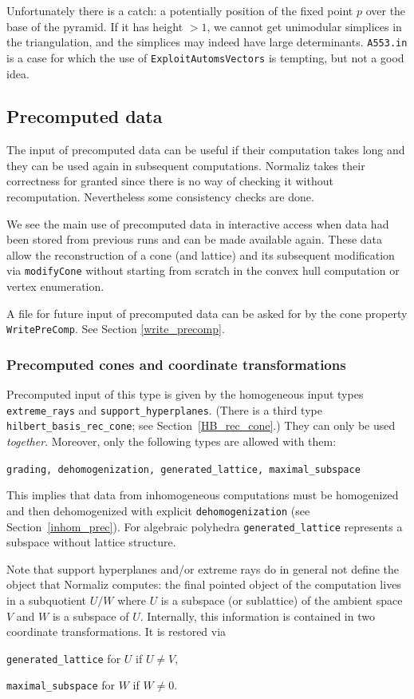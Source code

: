 Unfortunately there is a catch: a potentially position of the fixed point $p$ over the base of the pyramid. If it has height $> 1$, we cannot get unimodular simplices in the triangulation, and the simplices may indeed have large determinants. \verb|A553.in| is a case for which the use of \verb|ExploitAutomsVectors| is tempting, but not a good idea.

\subsection{Precomputed data}\label{precomputed_data}

The input of precomputed data can be useful if their computation takes long and they can be used again in subsequent computations. Normaliz takes their correctness for granted since there is no way of checking it without recomputation. Nevertheless some consistency checks are done.

We see the main use of precomputed data in interactive access when data had been stored from previous runs and can be made available again. These data allow the reconstruction of a cone (and lattice) and its subsequent modification via \verb|modifyCone| without starting from scratch in the convex hull computation or vertex enumeration.

A file for future input of precomputed data can be asked for by the cone property \verb|WritePreComp|. See Section \ref{write_precomp}.

\subsubsection{Precomputed cones and coordinate transformations}

Precomputed input of this type is given by the homogeneous input types \verb|extreme_rays| and \verb|support_hyperplanes|. (There is a third type \verb|hilbert_basis_rec_cone|; see Section~\ref{HB_rec_cone}.) They can only be used \emph{together}. Moreover, only the following types are allowed with them:
\begin{center}
	\verb|grading, dehomogenization, generated_lattice, maximal_subspace|
\end{center}
This implies that data from inhomogeneous computations must be homogenized and then dehomogenized with explicit \verb|dehomogenization| (see Section~\ref{inhom_prec}). For algebraic polyhedra \verb|generated_lattice| represents a subspace without lattice structure.

Note that support hyperplanes and/or extreme rays do in general not define the object that Normaliz computes: the final pointed object of the computation lives in a subquotient $U/W$ where $U$ is a subspace (or sublattice) of the ambient space $V$ and $W$ is a subspace of $U$. Internally, this information is contained in two coordinate transformations. It is restored via
\begin{arab}
	\item \verb|generated_lattice| for $U$ if $U\neq V$,
	\item \verb|maximal_subspace| for $W$ if $W\neq 0$.
\end{arab}

